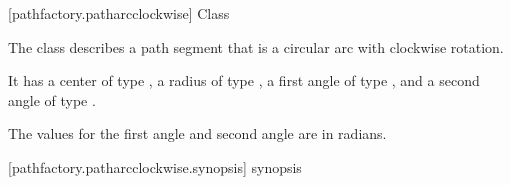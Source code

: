  [pathfactory.patharcclockwise] {Class }

\pnum
{}
The class  describes a path segment that is a circular arc with clockwise rotation.

\pnum
It has a center of type , a radius of type , a first angle of type , and a second angle of type .

\pnum
The values for the first angle and second angle are in radians.

%
%
%
%
%
%
%
%
%
%
%
 [pathfactory.patharcclockwise.synopsis] { synopsis}

